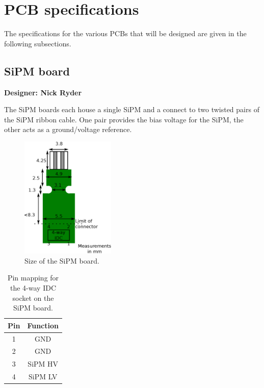 \documentclass[a4paper]{article}
\begin{document}
\section{PCB specifications}

The specifications for the various PCBs that will be designed are given in the following subsections.

\subsection{SiPM board}

{\bf Designer: Nick Ryder}

The SiPM boards each house a single SiPM and a connect to two twisted pairs of the SiPM ribbon cable.
One pair provides the bias voltage for the SiPM, the other acts as a ground/voltage reference.

\begin{figure}[h]
    \begin{center}
        \includegraphics[width=0.4\textwidth]{imgs/sipmboardsize}
        \caption{Size of the SiPM board.}
        \label{fig:sipmboardsize}
    \end{center}
\end{figure}


\begin{table}[h]
    \begin{center}
        \caption{Pin mapping for the 4-way IDC socket on the SiPM board.}
        \label{tab:IDC4waySiPM}
        \begin{tabular}{cc}
            \hline
            \hline
            Pin & Function \\
            \hline
            1 & GND \\
            2 & GND \\
            3 & SiPM HV \\
            4 & SiPM LV \\
            \hline
            \hline
        \end{tabular}
    \end{center}
\end{table}
\end{document}
